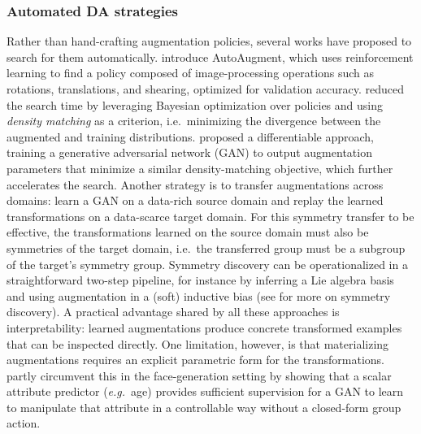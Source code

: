 \documentclass[mathematics,review,submit,moreauthors]{Definitions/mdpi}
\begin{document}
\subsubsection{Automated DA strategies}\label{par:auto-da}
Rather than hand-crafting augmentation policies, several works have proposed to search for them automatically.
\citet{cubuk20192iccvprc} introduce AutoAugment, which uses reinforcement learning to find a policy composed of image-processing operations such as rotations, translations, and shearing, optimized for validation accuracy.
\citet{lim2019anips} reduced the search time by leveraging Bayesian optimization over policies and using \textit{density matching} as a criterion, i.e.\ minimizing the divergence between the augmented and training distributions.
\citet{hataya2020cv-e2} proposed a differentiable approach, training a generative adversarial network (GAN) to output augmentation parameters that minimize a similar density-matching objective, which further accelerates the search.
Another strategy is to transfer augmentations across domains: \citet{antoniou2018} learn a GAN on a data-rich source domain and replay the learned transformations on a data-scarce target domain.
For this symmetry transfer to be effective, the transformations learned on the source domain must also be symmetries of the target domain, i.e.\ the transferred group must be a subgroup of the target's symmetry group. 
Symmetry discovery can be operationalized in a straightforward two-step pipeline, for instance by inferring a Lie algebra basis and using augmentation in a (soft) inductive bias \citep{escriche2025,yang2023p4icml} (see  for more on symmetry discovery).
A practical advantage shared by all these approaches is interpretability: learned augmentations produce concrete transformed examples that can be inspected directly.
One limitation, however, is that materializing augmentations requires an explicit parametric form for the transformations.
\citet{shoshan2021} partly circumvent this in the face-generation setting by showing that a scalar attribute predictor (\textit{e.g.}\ age) provides sufficient supervision for a GAN to learn to manipulate that attribute in a controllable way without a closed-form group action.
\end{document}
